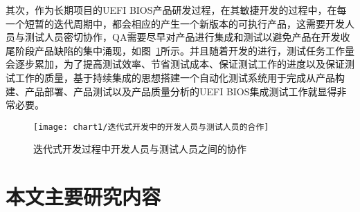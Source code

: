   其次，作为长期项目的UEFI BIOS产品研发过程，在其敏捷开发的过程中，在每一个短暂的迭代周期中，都会相应的产生一个新版本的可执行产品，这需要开发人员与测试人员密切协作，QA需要尽早对产品进行集成和测试以避免产品在开发收尾阶段产品缺陷的集中涌现，如图~\ref{fig:迭代式开发中的开发人员与测试人员的合作}所示。并且随着开发的进行，测试任务工作量会逐步累加，为了提高测试效率、节省测试成本、保证测试工作的进度以及保证测试工作的质量，基于持续集成的思想搭建一个自动化测试系统用于完成从产品构建、产品部署、产品测试以及产品质量分析的UEFI BIOS集成测试工作就显得非常必要。
  
	\begin{figure}[H] %
		\centering
		\texttt{[image: chart1/迭代式开发中的开发人员与测试人员的合作]}
		\caption{迭代式开发过程中开发人员与测试人员之间的协作}
		\label{fig:迭代式开发中的开发人员与测试人员的合作}
	\end{figure}
  
\section{本文主要研究内容}

